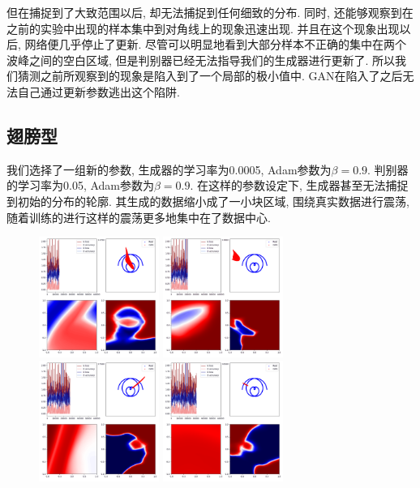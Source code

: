 \documentclass[lang=cn,11pt]{elegantpaper}
\begin{document}
但在捕捉到了大致范围以后, 却无法捕捉到任何细致的分布. 同时, 还能够观察到在之前的实验中出现的样本集中到对角线上的现象迅速出现. 并且在这个现象出现以后, 网络便几乎停止了更新. 尽管可以明显地看到大部分样本不正确的集中在两个波峰之间的空白区域, 但是判别器已经无法指导我们的生成器进行更新了. 所以我们猜测之前所观察到的现象是陷入到了一个局部的极小值中. GAN在陷入了之后无法自己通过更新参数逃出这个陷阱. 

\subsection{翅膀型}

我们选择了一组新的参数, 生成器的学习率为0.0005, Adam参数为$\beta=0.9$. 判别器的学习率为0.05, Adam参数为$\beta=0.9$. 在这样的参数设定下, 生成器甚至无法捕捉到初始的分布的轮廓. 其生成的数据缩小成了一小块区域, 围绕真实数据进行震荡, 随着训练的进行这样的震荡更多地集中在了数据中心.

\begin{figure}[hbt]
\centering
  \includegraphics[width=0.35\textwidth]{wings_4_1}
  \includegraphics[width=0.35\textwidth]{wings_4_2}\\
  \includegraphics[width=0.35\textwidth]{wings_4_3}
  \includegraphics[width=0.35\textwidth]{wings_4_4}
\end{figure}
\end{document}
